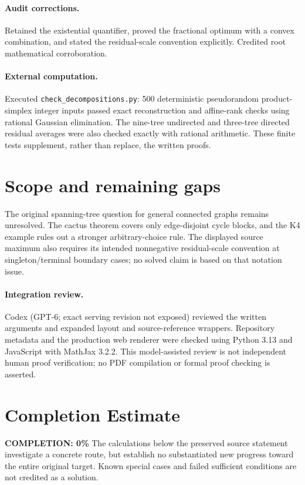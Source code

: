 \documentclass[11pt]{article}
\begin{document}
\paragraph{Audit corrections.} Retained the existential quantifier, proved the fractional optimum with a convex combination, and stated the residual-scale convention explicitly. Credited root mathematical corroboration.
\paragraph{External computation.} Executed \texttt{check\_decompositions.py}: 500 deterministic pseudorandom product-simplex integer inputs passed exact reconstruction and affine-rank checks using rational Gaussian elimination. The nine-tree undirected and three-tree directed residual averages were also checked exactly with rational arithmetic. These finite tests supplement, rather than replace, the written proofs.
\section{Scope and remaining gaps}
The original spanning-tree question for general connected graphs remains unresolved. The cactus theorem covers only edge-disjoint cycle blocks, and the K4 example rules out a stronger arbitrary-choice rule. The displayed source maximum also requires its intended nonnegative residual-scale convention at singleton/terminal boundary cases; no solved claim is based on that notation issue.
\paragraph{Integration review.} Codex (GPT-6; exact serving revision not exposed) reviewed the written arguments and expanded layout and source-reference wrappers. Repository metadata and the production web renderer were checked using Python 3.13 and JavaScript with MathJax 3.2.2. This model-assisted review is not independent human proof verification; no PDF compilation or formal proof checking is asserted.

\section{Completion Estimate}
\noindent\textbf{COMPLETION: 0\%}
The calculations below the preserved source statement investigate a concrete route,
but establish no substantiated new progress toward the entire original target.
Known special cases and failed sufficient conditions are not credited as a solution.
\end{document}
